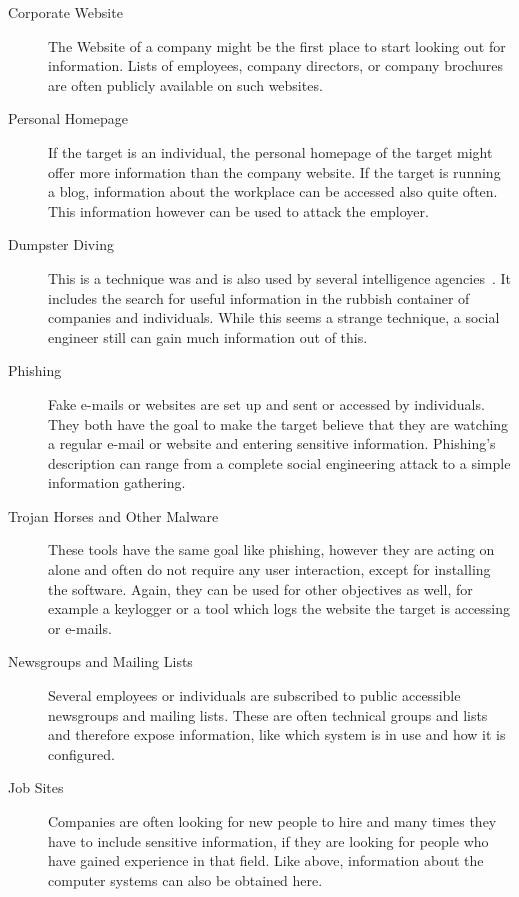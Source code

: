 \begin{description}

\item[Corporate Website] The Website of a company might be the first place to
  start looking out for information. Lists of employees,
  company directors, or company brochures are often publicly available on such websites. 
\item[Personal Homepage] If the target is an individual, the personal homepage
  of the target might offer more information than the company website. If the
  target is running a blog, information about the workplace can be accessed
  also quite often. This information however can be used to attack the
  employer.
\item[Dumpster Diving] This is a technique was and is also used by several
  intelligence agencies~\cite{lively2003}. It includes the search
  for useful information in the rubbish container of companies and individuals. While
  this seems a strange technique, a social engineer still can gain much
  information out of this.
\item[Phishing] Fake e-mails or websites are set up and sent or accessed by
  individuals. They both have the goal to make the target believe that they are
  watching a regular e-mail or website and entering sensitive information.
  Phishing's description can range from a complete social engineering attack to
  a simple information gathering.
\item[Trojan Horses and Other Malware] These tools have the same goal like
  phishing, however they are acting on alone and often do not require any
  user interaction, except for installing the software. Again, they can
  be used for other objectives as well, for example a keylogger or a tool
  which logs the website the target is accessing or e-mails.
\item[Newsgroups and Mailing Lists] Several employees or individuals are
  subscribed to public accessible newsgroups and mailing lists. These are often
  technical groups and lists and therefore expose information, like which system
  is in use and how it is configured.
\item[Job Sites] Companies are often looking for new people to hire and many
  times they have to include sensitive information, if they are looking for
  people who have gained experience in that field. Like above, information about the
  computer systems can also be obtained here.
\end{description}

